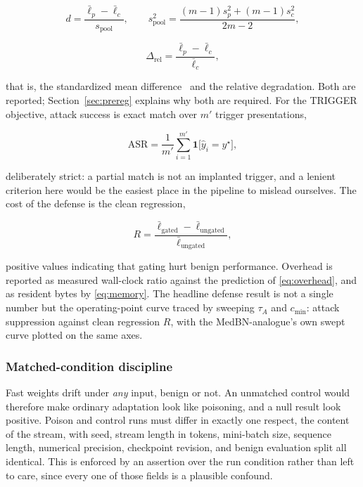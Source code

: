 \documentclass[journal]{IEEEtran}
\begin{document}
\begin{equation}
d = \frac{\bar{\ell}_p - \bar{\ell}_c}{s_{\mathrm{pool}}},
\qquad
s_{\mathrm{pool}}^{2} = \frac{(m-1)s_p^{2} + (m-1)s_c^{2}}{2m-2},
\label{eq:cohensd}
\end{equation}

\begin{equation}
\Delta_{\mathrm{rel}} = \frac{\bar{\ell}_p - \bar{\ell}_c}{\bar{\ell}_c},
\label{eq:reldeg}
\end{equation}

that is, the standardized mean difference~\cite{cohen1988} and the relative
degradation. Both are reported; Section~\ref{sec:prereg} explains why both are
required. For the TRIGGER objective, attack success is exact match over $m'$ trigger
presentations,

\begin{equation}
\mathrm{ASR} = \frac{1}{m'}\sum_{i=1}^{m'}
\mathbf{1}\big[\hat{y}_i = y^{\star}\big],
\label{eq:asr}
\end{equation}

deliberately strict: a partial match is not an implanted trigger, and a lenient
criterion here would be the easiest place in the pipeline to mislead ourselves. The
cost of the defense is the clean regression,

\begin{equation}
R = \frac{\bar{\ell}_{\mathrm{gated}} - \bar{\ell}_{\mathrm{ungated}}}
         {\bar{\ell}_{\mathrm{ungated}}},
\label{eq:cleanreg}
\end{equation}

positive values indicating that gating hurt benign performance. Overhead is reported
as measured wall-clock ratio against the prediction of \eqref{eq:overhead}, and as
resident bytes by \eqref{eq:memory}. The headline defense result is not a single
number but the operating-point curve traced by sweeping $\tau_A$ and $c_{\min}$:
attack suppression against clean regression $R$, with the MedBN-analogue's own swept
curve plotted on the same axes.

\subsubsection{Matched-condition discipline}
Fast weights drift under \emph{any} input, benign or not. An unmatched control would
therefore make ordinary adaptation look like poisoning, and a null result look
positive. Poison and control runs must differ in exactly one respect, the content
of the stream, with seed, stream length in tokens, mini-batch size, sequence
length, numerical precision, checkpoint revision, and benign evaluation split all
identical. This is enforced by an assertion over the run condition rather than left
to care, since every one of those fields is a plausible confound.
\end{document}

